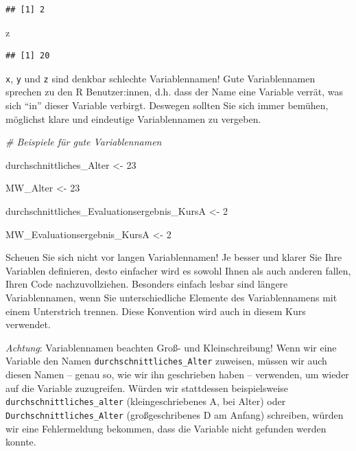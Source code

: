\documentclass[
  ngerman,
]{book}
\newenvironment{Shaded}{\begin{snugshade}}{\end{snugshade}}
\newcommand{\CommentTok}[1]{\textcolor[rgb]{0.56,0.35,0.01}{\textit{#1}}}
\newcommand{\DecValTok}[1]{\textcolor[rgb]{0.00,0.00,0.81}{#1}}
\newcommand{\NormalTok}[1]{#1}
\newcommand{\OtherTok}[1]{\textcolor[rgb]{0.56,0.35,0.01}{#1}}
\begin{document}
\begin{verbatim}
## [1] 2
\end{verbatim}

\begin{Shaded}
\begin{Highlighting}[]
\NormalTok{z}
\end{Highlighting}
\end{Shaded}

\begin{verbatim}
## [1] 20
\end{verbatim}

\texttt{x}, \texttt{y} und \texttt{z} sind denkbar schlechte Variablennamen! Gute Variablennamen sprechen zu den R Benutzer:innen, d.h. dass der Name eine Variable verrät, was sich ``in'' dieser Variable verbirgt. Deswegen sollten Sie sich immer bemühen, möglichst klare und eindeutige Variablennamen zu vergeben.

\begin{Shaded}
\begin{Highlighting}[]
\CommentTok{\# Beispiele für gute Variablennamen}

\NormalTok{durchschnittliches\_Alter }\OtherTok{\textless{}{-}} \DecValTok{23}

\NormalTok{MW\_Alter }\OtherTok{\textless{}{-}} \DecValTok{23}

\NormalTok{durchschnittliches\_Evaluationsergebnis\_KursA }\OtherTok{\textless{}{-}} \DecValTok{2}

\NormalTok{MW\_Evaluationsergebnis\_KursA }\OtherTok{\textless{}{-}} \DecValTok{2}
\end{Highlighting}
\end{Shaded}

Scheuen Sie sich nicht vor langen Variablennamen! Je besser und klarer Sie Ihre Variablen definieren, desto einfacher wird es sowohl Ihnen als auch anderen fallen, Ihren Code nachzuvollziehen. Besonders einfach lesbar sind längere Variablennamen, wenn Sie unterschiedliche Elemente des Variablennamens mit einem Unterstrich trennen. Diese Konvention wird auch in diesem Kurs verwendet.

\emph{Achtung}: Variablennamen beachten Groß- und Kleinschreibung! Wenn wir eine Variable den Namen \texttt{durchschnittliches\_Alter} zuweisen, müssen wir auch diesen Namen -- genau so, wie wir ihn geschrieben haben -- verwenden, um wieder auf die Variable zuzugreifen. Würden wir stattdessen beispielsweise \texttt{durchschnittliches\_alter} (kleingeschriebenes A, bei Alter) oder \texttt{Durchschnittliches\_Alter} (großgeschribenes D am Anfang) schreiben, würden wir eine Fehlermeldung bekommen, dass die Variable nicht gefunden werden konnte.
\end{document}
